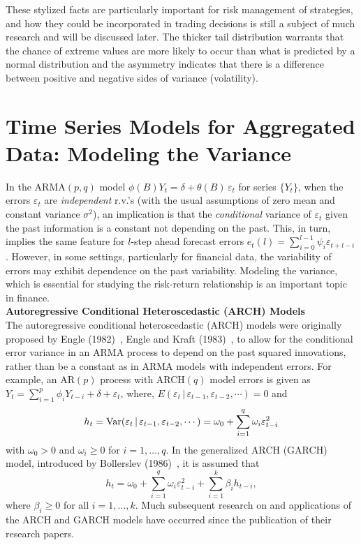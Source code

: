 These stylized facts are particularly important for risk management of strategies, and how they could be incorporated in trading decisions is still a subject of much research and will be discussed later. The thicker tail distribution warrants that the chance of extreme values are more likely to occur than what is predicted by a normal distribution and the asymmetry indicates that there is a difference between positive and negative sides of variance (volatility). 


\section{Time Series Models for Aggregated Data: Modeling the Variance}


In the ARMA$(p,q)$ model $\phi(B)Y_t= \delta + \theta(B) \,\varepsilon_t$ for series $\{Y_t\}$, when the errors $\varepsilon_t$ are \textit{independent} r.v.'s (with the usual assumptions of zero mean and constant variance $\sigma^2$), an implication is that the \textit{conditional} variance of $\varepsilon_t$ given the past information is a constant not depending on the past. This, in turn, implies the same feature for $l$-step ahead forecast errors $e_t(l) = \sum_{i=0}^{l-1}\psi_i\varepsilon_{t+l-i}$. However, in some settings, particularly for financial data, the variability of errors may exhibit dependence on the past variability. Modeling the variance, which is essential for studying the risk-return relationship is an important topic in finance. \\


\noindent \textbf{Autoregressive Conditional Heteroscedastic (ARCH) Models} \\


The autoregressive conditional heteroscedastic (ARCH) models were originally proposed by Engle (1982)~\cite{engle1982}, Engle and Kraft (1983)~\cite{engle1983}, to allow for the conditional error variance in an ARMA process to depend on the past squared innovations, rather than be a constant as in ARMA models with independent errors. For example, an AR$(p)$ process with ARCH$(q)$ model errors is given as $Y_t = \sum_{i=1}^p\phi_iY_{t-i} + \delta + \varepsilon_t$, where, $E(\varepsilon_t\,|\,\varepsilon_{t-1},\varepsilon_{t-2},\cdots)= 0$ and
	\begin{equation}\label{eqn:2ht}
	h_t= \Var(\varepsilon_t \,|\, \varepsilon_{t-1},\varepsilon_{t-2},\cdots) = \omega_0 + \sum_{i=1}^q\omega_i\varepsilon_{t-i}^2
	\end{equation}
with $\omega_0 > 0$ and $\omega_i \geq 0$ for $i= 1,\ldots,q$. In the generalized ARCH (GARCH) model, introduced by Bollerslev (1986)~\cite{bollerslev1986}, it is assumed that
	\begin{equation}\label{eqn:2secondht}
	h_t = \omega_0 + \sum_{i=1}^q\omega_i\varepsilon_{t-i}^2 + \sum_{i=1}^k\beta_ih_{t-i},
	\end{equation}
where $\beta_i \geq 0$ for all $i = 1,\ldots,k$. Much subsequent research on and applications of the ARCH and GARCH models have occurred since the publication of their research papers.


